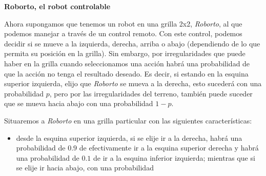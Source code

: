 \textbf{Roborto, el robot controlable}

Ahora supongamos que tenemos un robot en una grilla 2x2, \emph{Roborto}, al que
podemos manejar a través de un control remoto. Con este control, podemos
decidir si se mueve a la izquierda, derecha, arriba o abajo (dependiendo de lo
que permita su posición en la grilla). Sin embargo, por irregularidades que
puede haber en la grilla cuando seleccionamos una acción habrá una probabilidad
de que la acción no tenga el resultado deseado. Es decir, si estando en la
esquina superior izquierda, elijo que \emph{Roborto} se mueva a la derecha,
esto sucederá con una probabilidad $p$, pero por las irregularidades del
terreno, también puede suceder que se mueva hacia abajo con una probabilidad $1
	- p$.

Situaremos a \emph{Roborto} en una grilla particular con las siguientes
características:

\begin{itemize}
	\item desde la esquina superior izquierda, si se elije ir a la derecha, habrá una
	      probabilidad de $0.9$ de efectivamente ir a la esquina superior derecha y habrá
	      una probabilidad de $0.1$ de ir a la esquina inferior izquierda; mientras que
	      si se elije ir hacia abajo, con una probabilidad
\end{itemize}

